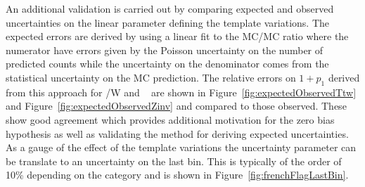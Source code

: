 An additional validation is carried out by comparing expected and observed uncertainties
on the linear parameter defining the template variations.
The expected errors are derived by using a linear fit to the MC/MC ratio where the numerator
have errors given by the Poisson uncertainty on the number of predicted counts while
the uncertainty on the denominator comes from the statistical uncertainty on the
MC prediction. The relative errors on $1+p_1$ derived from this approach 
for \ttbar/W and \zInv~ are shown in Figure~\ref{fig:expectedObservedTtw} 
and Figure~\ref{fig:expectedObservedZinv} and compared to those observed.
These show good agreement which provides additional motivation for the 
zero bias hypothesis as well as validating the method for deriving expected uncertainties.
As a gauge of the effect of the template variations the uncertainty parameter 
can be translate to an uncertainty on the last bin. This is typically
of the order of 10\% depending on the category and is shown
in Figure~\ref{fig:frenchFlagLastBin}.


